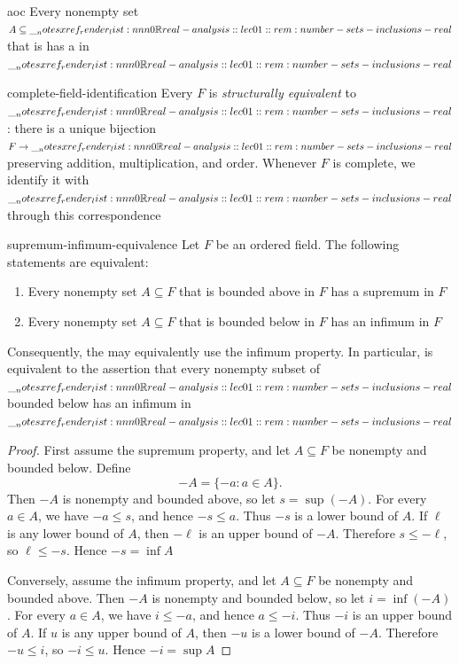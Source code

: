 \documentclass[12pt]{article}
\begin{document}
\begin{axm}{aoc}
Every nonempty set \(A\subseteq\RR\) that is  has a 
 in \(\RR\) 
\end{axm}

\begin{rem}{complete-field-identification}
  Every  \(F\)
  is \emph{structurally equivalent} to \(\RR\): there is a unique
  bijection \(F\to\RR\) preserving addition, multiplication, and order.
  Whenever \(F\) is complete, we identify it with \(\RR\) through
  this correspondence
\end{rem}

\begin{lem}{supremum-infimum-equivalence}
  Let \(F\) be an ordered field. The following statements are equivalent:
  \begin{enumerate}[nosep]
    \item Every nonempty set \(A\subseteq F\) that is bounded above in
      \(F\) has a supremum in \(F\)
    \item Every nonempty set \(A\subseteq F\) that is bounded below in
      \(F\) has an infimum in \(F\)
  \end{enumerate}
  Consequently, the  may equivalently use the infimum property.
  In particular,  is equivalent
  to the assertion that every nonempty subset of \(\RR\) bounded
  below has an infimum in \(\RR\)
\end{lem}

\begin{proof}
  First assume the supremum property, and let \(A\subseteq F\) be nonempty
  and bounded below. Define
  \[
    -A=\{-a:a\in A\}.
  \]
  Then \(-A\) is nonempty and bounded above, so let \(s=\sup(-A)\).
  For every \(a\in A\), we have \(-a\le s\), and hence \(-s\le a\).
  Thus \(-s\) is a lower bound of \(A\). If \(\ell\) is any lower bound
  of \(A\), then \(-\ell\) is an upper bound of \(-A\). Therefore
  \(s\le-\ell\), so \(\ell\le-s\). Hence \(-s=\inf A\)

  Conversely, assume the infimum property, and let \(A\subseteq F\) be
  nonempty and bounded above. Then \(-A\) is nonempty and bounded below,
  so let \(i=\inf(-A)\). For every \(a\in A\), we have \(i\le-a\), and
  hence \(a\le-i\). Thus \(-i\) is an upper bound of \(A\). If \(u\) is
  any upper bound of \(A\), then \(-u\) is a lower bound of \(-A\).
  Therefore \(-u\le i\), so \(-i\le u\). Hence \(-i=\sup A\)
\end{proof}
\end{document}
